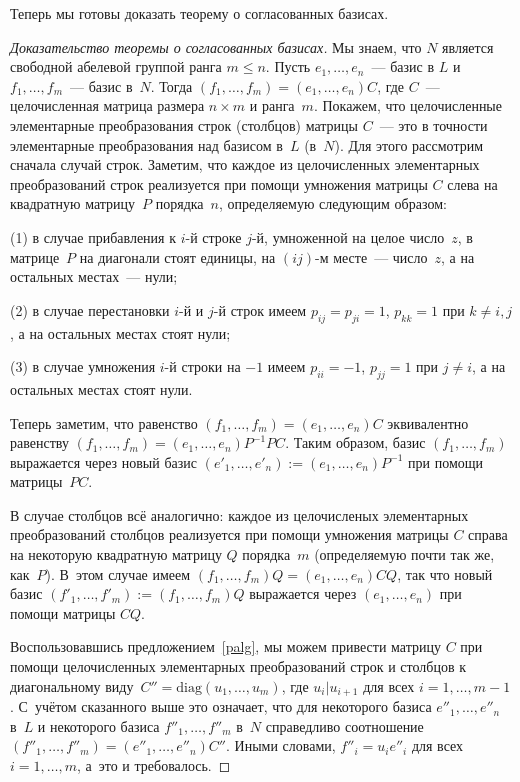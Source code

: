 \documentclass[a4paper,10pt]{amsart}
\theoremstyle{definition}
\theoremstyle{remark}
\begin{document}
Теперь мы готовы доказать теорему о согласованных базисах.

\begin{proof}[Доказательство теоремы о согласованных базисах]
Мы знаем, что $N$ является свободной абелевой группой ранга $m
\leqslant n$. Пусть $e_1, \ldots, e_n$~--- базис в $L$ и $f_1,
\ldots, f_m$~--- базис в~$N$. Тогда $(f_1, \ldots, f_m) = (e_1,
\ldots, e_n)C$, где $C$~--- целочисленная матрица размера $n \times
m$ и ранга~$m$. Покажем, что целочисленные элементарные
преобразования строк (столбцов) матрицы $C$~--- это в точности
элементарные преобразования над базисом в~$L$ (в~$N$). Для этого
рассмотрим сначала случай строк. Заметим, что каждое из
целочисленных элементарных преобразований строк реализуется при
помощи умножения матрицы $C$ слева на квадратную матрицу~$P$
порядка~$n$, определяемую следующим образом:

(1) в случае прибавления к $i$-й строке $j$-й, умноженной на целое
число~$z$, в матрице~$P$ на диагонали стоят единицы, на $(ij)$-м
месте~--- число~$z$, а на остальных местах~--- нули;

(2) в случае перестановки $i$-й и $j$-й строк имеем $p_{ij} = p_{ji}
= 1$, $p_{kk} = 1$ при $k \ne i,j$, а на остальных местах стоят
нули;

(3) в случае умножения $i$-й строки на $-1$ имеем $p_{ii} = -1$,
$p_{jj} = 1$ при $j \ne i$, а на остальных местах стоят нули.

Теперь заметим, что равенство $(f_1, \ldots, f_m) = (e_1, \ldots,
e_n)C$ эквивалентно равенству $(f_1, \ldots, f_m) = (e_1, \ldots,
e_n)P^{-1} PC$. Таким образом, базис $(f_1, \ldots, f_m)$ выражается
через новый базис $(e'_1, \ldots, e'_n) := (e_1, \ldots, e_n)P^{-1}$
при помощи матрицы~$PC$.

В случае столбцов всё аналогично: каждое из целочисленых
элементарных преобразований столбцов реализуется при помощи
умножения матрицы $C$ справа на некоторую квадратную матрицу $Q$
порядка~$m$ (определяемую почти так же, как~$P$). В~этом случае
имеем $(f_1, \ldots, f_m)Q = (e_1, \ldots, e_n)CQ$, так что новый
базис $(f'_1, \ldots, f'_m) := (f_1, \ldots, f_m)Q$ выражается через
$(e_1, \ldots, e_n)$ при помощи матрицы $CQ$.

Воспользовавшись предложением~\ref{palg}, мы можем привести матрицу
$C$ при помощи целочисленных элементарных преобразований строк и
столбцов к диагональному виду~$C'' = \text{diag}(u_1, \ldots, u_m)$,
где $u_i | u_{i+1}$ для всех $i = 1, \ldots, m-1$. С~учётом
сказанного выше это означает, что для некоторого базиса $e''_1,
\ldots, e''_n$ в~$L$ и некоторого базиса $f''_1, \ldots, f''_m$
в~$N$ справедливо соотношение $(f''_1, \ldots, f''_m) = (e''_1,
\ldots, e''_n) C''$. Иными словами, $f''_i = u_i e''_i$ для всех $i
= 1, \ldots, m$, а~это и требовалось.
\end{proof}
\end{document}
